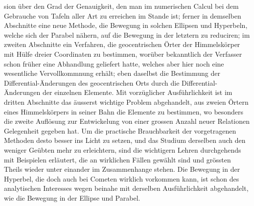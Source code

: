 \noindent sion über den Grad der Genauigkeit, den man im numerischen Calcul bei dem Gebrauche von Tafeln aller Art zu erreichen im Stande ist; ferner in demselben Abschnitte eine neue Methode, die Bewegung in solchen Ellipsen und Hyperbeln, welche sich der Parabel nähern, auf die Bewegung in der letztern zu reduciren; im zweiten Abschnitte ein Verfahren, die geocentrischen Örter der Himmelskörper mit Hülfe dreier Coordinaten zu bestimmen, worüber bekanntlich der Verfasser schon früher eine Abhandlung geliefert hatte, welches aber hier noch eine wesentliche Vervollkommnung erhält; eben daselbst die Bestimmung der Differential-Änderungen des geocentrischen Orts durch die Differential-Änderungen der einzelnen Elemente. Mit vorzüglicher Ausführlichkeit ist im dritten Abschnitte das äusserst wichtige Problem abgehandelt, aus zweien Örtern eines Himmelskörpers in seiner Bahn die Elemente zu bestimmen, wo besonders die zweite Auflösung zur Entwickelung von einer grossen Anzahl neuer Relationen Gelegenheit gegeben hat. Um die practische Brauchbarkeit der vorgetragenen Methoden desto besser ins Licht zu setzen, und das Studium derselben auch den weniger Geübten mehr zu erleichtern, sind die wichtigern Lehren durchgehends mit Beispielen erläutert, die an wirklichen Fällen gewählt sind und grössten Theils wieder unter einander im Zusammenhange stehen. Die Bewegung in der Hyperbel, die doch auch bei Cometen wirklich vorkommen kann, ist schon des analytischen Interesses wegen beinahe mit derselben Ausführlichkeit abgehandelt, wie die Bewegung in der Ellipse und Parabel.

